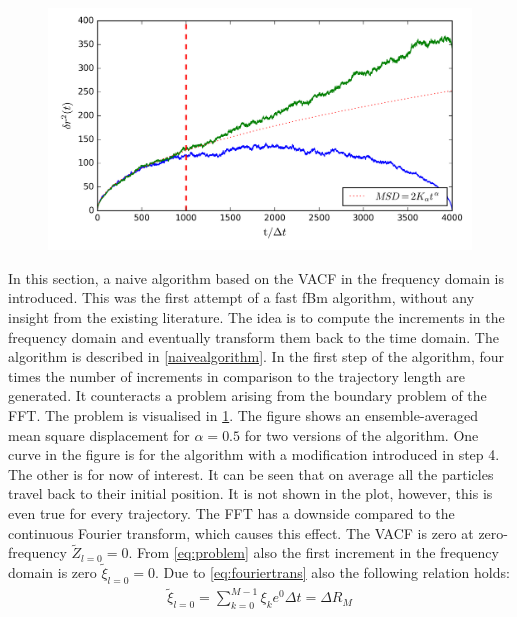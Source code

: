 \documentclass[
  a4paper,BCOR10mm,oneside,
  headsepline,footsepline,%
  fleqn,openbib
]{scrbook}
\begin{document}
\begin{figure}[h]
  \centering
  \includegraphics[width=\textwidth]{./data/nocorrectionmsd1.png}
  \captionsetup{width=\linewidth}
  \label{fig:41}
\end{figure}
In this section, a naive algorithm based on the VACF in the frequency domain is introduced. This was the first attempt of a fast fBm algorithm, without any insight from the existing literature. The idea is to compute the increments in the frequency domain and eventually transform them back to the time domain. The algorithm is described in \cref{naivealgorithm}. In the first step of the algorithm, four times the number of increments in comparison to the trajectory length are generated. It counteracts a problem arising from the boundary problem of the FFT. The problem is visualised in \cref{fig:41}. The figure shows an ensemble-averaged mean square displacement for $\alpha=0.5$ for two versions of the algorithm. One curve in the figure is for the algorithm with a modification introduced in step 4. The other is for now of interest. It can be seen that on average all the particles travel back to their initial position. It is not shown in the plot, however, this is even true for every trajectory. The FFT has a downside compared to the continuous Fourier transform, which causes this effect. The VACF is zero at zero-frequency $ \tilde{Z}_{l=0}=0$.  From \cref{eq:problem} also the first increment in the frequency domain is zero $ \tilde{\xi}_{l=0}=0$. Due to \cref{eq:fouriertrans} also the following relation holds:
 \begin{align}
   \tilde{\xi}_{l=0} = \sum_{k=0}^{M-1} \xi_k e^{0} \Delta t = \Delta  R_{M} \label{correction}
 \end{align}
\end{document}
